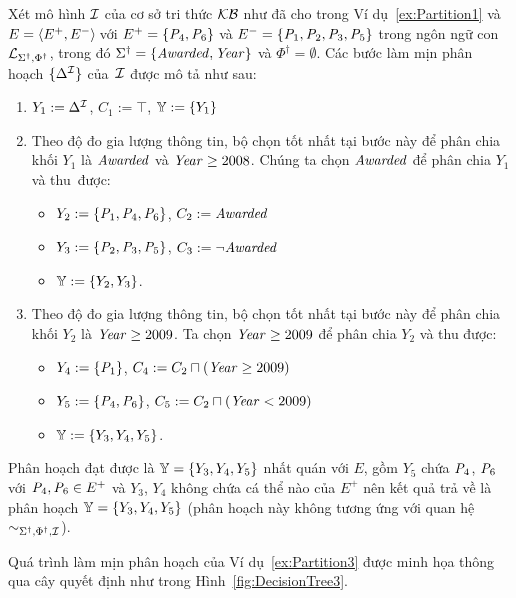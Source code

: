 \begin{Example}
\label{ex:Partition3}
Xét mô hình $\mathcal{I}$ của cơ sở tri thức $\mathcal{KB}$ như đã cho trong Ví dụ~\ref{ex:Partition1} và $E = \left\langle E^+, E^-\right\rangle\!$ với $E^+ = \{\mathit{P}_4, \mathit{P}_6\}$ và $E^- = \{\mathit{P}_1, \mathit{P}_2, \mathit{P}_3, \mathit{P}_5\}$ trong ngôn ngữ con $\mathcal{L}_{\Sigma^\dag,\Phi^\dag}$, trong đó $\Sigma^\dag = \{\mathit{Awarded},\mathit{Year}\}$ và $\Phi^\dag = \emptyset$. Các bước làm mịn phân hoạch $\{\Delta^{\mathcal{I}}\}$ của~$\mathcal{I}$ được mô tả như sau:
\begin{enumerate}
	\item $Y_1 := \Delta^{\mathcal{I}}$, $C_1 := \top$, $\mathbb{Y} := \{Y_1\}$
	\item Theo độ đo gia lượng thông tin, bộ chọn tốt nhất tại bước này để phân chia khối $Y_1$ là $\mathit{Awarded}$ và $\mathit{Year} \geq 2008$. Chúng ta chọn $\mathit{Awarded}$ để phân chia $Y_1$ và thu~được:
	\begin{itemize}
		\item $Y_2 := \{\mathit{P}_1, \mathit{P}_4, \mathit{P}_6\}$, $C_2 := \mathit{Awarded}$
		\item $Y_3 := \{\mathit{P}_2, \mathit{P}_3, \mathit{P}_5\}$, $C_3 := \neg\mathit{Awarded}$
		\item $\mathbb{Y} := \{Y_2, Y_3\}$.
	\end{itemize}
%
	\item Theo độ đo gia lượng thông tin, bộ chọn tốt nhất tại bước này để phân chia khối $Y_2$ là $\mathit{Year} \geq 2009$. Ta chọn $\mathit{Year} \geq 2009$ để phân chia $Y_2$ và thu được:
	\begin{itemize}
		\item $Y_4 := \{\mathit{P}_1\}$, $C_4 := C_2 \sqcap (\mathit{Year} \geq 2009)$
		\item $Y_5 := \{\mathit{P}_4, \mathit{P}_6\}$, $C_5 := C_2 \sqcap (\mathit{Year} < 2009)$
		\item $\mathbb{Y} := \{Y_3, Y_4, Y_5\}$.
	\end{itemize}
\end{enumerate}

Phân hoạch đạt được là $\mathbb{Y} = \{Y_3, Y_4, Y_5\}$ nhất quán với $E$, gồm $Y_5$ chứa $\mathit{P}_4$, $\mathit{P}_6$ với $\mathit{P}_4, \mathit{P}_6 \in E^+$ và $Y_3$, $Y_4$ không chứa cá thể nào của $E^+$ nên kết quả trả về là phân hoạch $\mathbb{Y} = \{Y_3,Y_4,Y_5\}$
(phân hoạch này không tương ứng với quan hệ $\sim_{\Sigma^\dag,\Phi^\dag,\mathcal{I}}$).\myend
\end{Example}

Quá trình làm mịn phân hoạch của Ví dụ~\ref{ex:Partition3} được minh họa thông qua cây quyết định như trong Hình~\ref{fig:DecisionTree3}.

